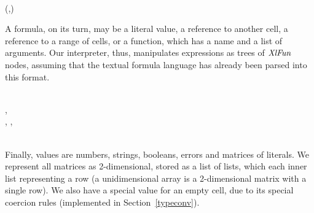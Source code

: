 \begin{hscode}\SaveRestoreHook
{}%
%
%
%
%
%
%
\>[B]{}\;\<[14]%
\>[14]{}\mathrel{=}{}\<[14E]%
\>[17]{}\;{}\<[27]%
\>[27]{}\<[E]%
\\
\>[14]{}\mid {}\<[14E]%
\>[17]{}\;{}\<[27]%
\>[27]{}\;(,){}\<[E]%
\\
\>[B]{}\<[4]%
\>[4]{}\;\<[E]%
\ColumnHook
\end{hscode}\resethooks

A formula, on its turn, may be a literal value, a reference to another cell, a
reference to a range of cells, or a function, which has a name and a list of
arguments. Our interpreter, thus, manipulates expressions as trees of \ensuremath{\Conid{XlFun}}
nodes, assuming that the textual formula language has already been parsed into
this format.

\begin{hscode}\SaveRestoreHook
{}%
%
%
%
%
%
%
\>[B]{}\;\<[17]%
\>[17]{}\mathrel{=}{}\<[17E]%
\>[20]{}\;{}\<[27]%
\>[27]{}\<[E]%
\\
\>[17]{}\mid {}\<[17E]%
\>[20]{}\;{}\<[27]%
\>[27]{}\llparenthesis \cdot , \cdot \rrparenthesis {}\<[E]%
\\
\>[17]{}\mid {}\<[17E]%
\>[20]{}\;{}\<[27]%
\>[27]{}\llparenthesis \cdot , \cdot \rrparenthesis \;\llparenthesis \cdot , \cdot \rrparenthesis {}\<[E]%
\\
\>[17]{}\mid {}\<[17E]%
\>[20]{}\;{}\<[27]%
\>[27]{}\<[E]%
\\
\>[B]{}\<[4]%
\>[4]{}\;\<[E]%
\ColumnHook
\end{hscode}\resethooks

Finally, values are numbers, strings, booleans, errors and matrices of
literals. We represent all matrices as 2-dimensional, stored as a list of
lists, which each inner list representing a row (a unidimensional array is a
2-dimensional matrix with a single row). We also have a special value
for an empty cell, due to its special coercion rules (implemented in
Section~\ref{typeconv}).

